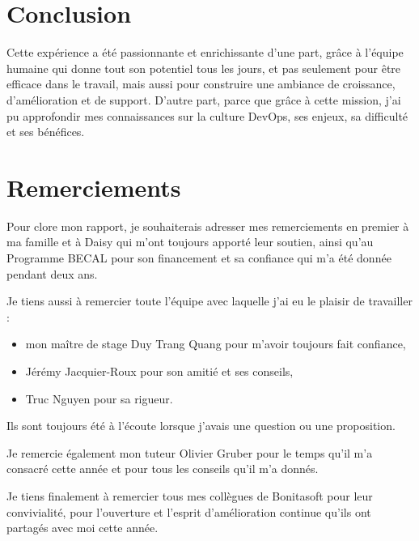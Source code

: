 \section{Conclusion}
Cette expérience a été passionnante et enrichissante d'une part, grâce à l'équipe humaine qui donne tout son potentiel tous les jours, et pas seulement pour être efficace dans le travail, mais aussi pour construire une ambiance de croissance, d'amélioration et de support.
D'autre part, parce que grâce à cette mission, j'ai pu approfondir mes connaissances sur la culture DevOps, ses enjeux, sa difficulté et ses bénéfices.

\section{Remerciements}
Pour clore mon rapport, je souhaiterais adresser mes remerciements en premier à ma famille et à Daisy qui m'ont toujours apporté leur soutien, ainsi qu’au Programme BECAL pour son financement et sa confiance qui m'a été donnée pendant deux ans.

Je tiens aussi à remercier toute l'équipe avec laquelle j'ai eu le plaisir de travailler :
\begin{itemize}
  \item[] mon maître de stage Duy Trang Quang pour m’avoir toujours fait confiance,
  \item[] Jérémy Jacquier-Roux pour son amitié et ses conseils,
  \item[] Truc Nguyen pour sa rigueur.
\end{itemize}
Ils sont toujours été à l'écoute lorsque j'avais une question ou une proposition.

Je remercie également mon tuteur Olivier Gruber pour le temps qu’il m’a consacré cette année et pour tous les conseils qu’il m’a donnés.

Je tiens finalement à remercier tous mes collègues de Bonitasoft pour leur convivialité, pour l’ouverture et l'esprit d'amélioration continue qu’ils ont partagés avec moi cette année.
